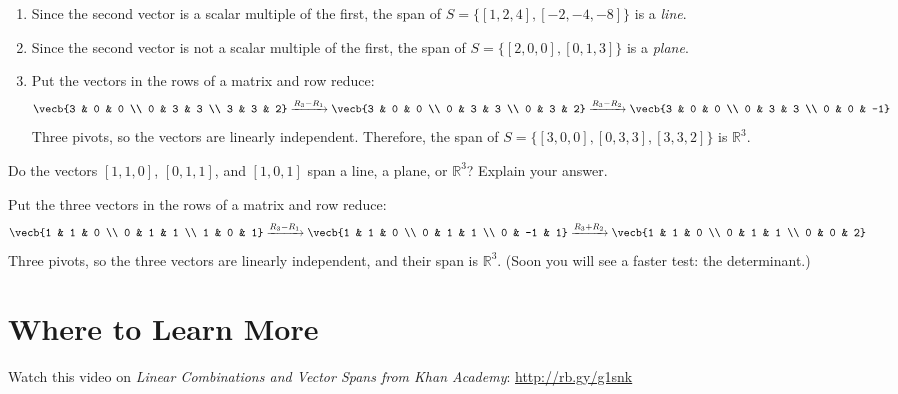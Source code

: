 \begin{Answer}[ref = span1]
\begin{enumerate}
\item Since the second vector is a scalar multiple of the first, the span of 
$S = \{ \left[1, 2, 4 \right], \left[-2, -4, -8 \right] \}$ is a \textit{line}.
\item Since the second vector is not a scalar multiple of the first, the span 
of $S = \{ \left[2, 0, 0 \right], \left[0, 1, 3 \right] \}$ is a 
\textit{plane}.
\item Put the vectors in the rows of a matrix and row reduce:
$$\vecb{3 & 0 & 0 \\ 0 & 3 & 3 \\ 3 & 3 & 2} \xrightarrow{R_3 - R_1}
\vecb{3 & 0 & 0 \\ 0 & 3 & 3 \\ 0 & 3 & 2} \xrightarrow{R_3 - R_2}
\vecb{3 & 0 & 0 \\ 0 & 3 & 3 \\ 0 & 0 & -1}$$
Three pivots, so the vectors are linearly independent. Therefore, the span of $S = \{ \left[3, 0, 0 \right], \left[ 0, 
3, 3 \right], \left[3, 3, 2 \right] \}$ is $\mathbb{R}^3$.
\end{enumerate}
\end{Answer}


\begin{Exercise}[title = {Span of Three Vectors}, label = span2]
Do the vectors $\left[ 1, 1, 0 \right]$, $\left[ 0, 1, 1 \right]$, and $\left[ 1, 0, 1 \right]$ span a line, a plane, or $\mathbb{R}^3$? Explain your answer.
\end{Exercise}

\begin{Answer}[ref = span2]
Put the three vectors in the rows of a matrix and row reduce:
$$\vecb{1 & 1 & 0 \\ 0 & 1 & 1 \\ 1 & 0 & 1} \xrightarrow{R_3 - R_1}
\vecb{1 & 1 & 0 \\ 0 & 1 & 1 \\ 0 & -1 & 1} \xrightarrow{R_3 + R_2}
\vecb{1 & 1 & 0 \\ 0 & 1 & 1 \\ 0 & 0 & 2}$$
Three pivots, so the three vectors are linearly independent, and their span is $\mathbb{R}^3$. (Soon you will see a faster test: the determinant.)
\end{Answer}


\section{Where to Learn More}
Watch this video on \emph {Linear Combinations and Vector Spans from Khan 
Academy}: \url{http://rb.gy/g1snk}